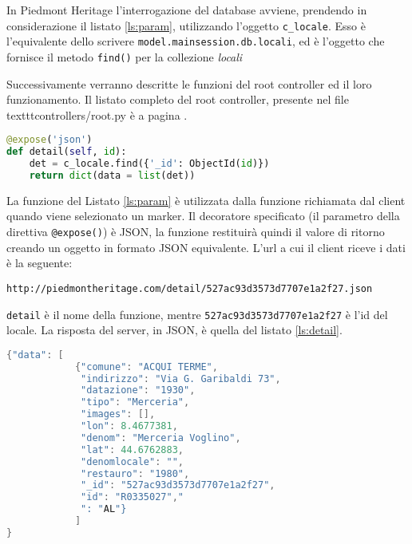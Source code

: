 In Piedmont Heritage l'interrogazione del database avviene, prendendo in considerazione il listato \ref{ls:param}, utilizzando l'oggetto \texttt{c\_locale}. Esso è l'equivalente dello scrivere \texttt{model.mainsession.db.locali}, ed è l'oggetto che fornisce il metodo \texttt{find()} per la collezione \emph{locali}


Successivamente verranno descritte le funzioni del root controller ed il loro funzionamento.
Il listato completo del root controller, presente nel file texttt{controllers/root.py} è a pagina \pageref{ls:completo}.

\begin{lstlisting}[label=ls:param,caption={Funzione utilizzata per richiedere i dettagli su un locale con ID=\texttt{id}},language=Python]
@expose('json')
def detail(self, id):
    det = c_locale.find({'_id': ObjectId(id)})
    return dict(data = list(det))
\end{lstlisting}

La funzione del Listato \ref{ls:param} è utilizzata dalla funzione richiamata dal client quando viene selezionato un marker. Il decoratore specificato (il parametro della direttiva \texttt{@expose()}) è JSON, la funzione restituirà quindi il valore di ritorno creando un oggetto in formato JSON equivalente. L'url a cui il client riceve i dati è la seguente:
\begin{lstlisting}
http://piedmontheritage.com/detail/527ac93d3573d7707e1a2f27.json
\end{lstlisting}
\texttt{detail} è il nome della funzione, mentre \texttt{527ac93d3573d7707e1a2f27} è l'id del locale. La risposta del server, in JSON, è quella del listato \ref{ls:detail}.

\begin{minipage}{\linewidth}
\begin{lstlisting}[label=ls:detail,caption={Dati in formato JSON restituiti dal server.},language=c]
{"data": [
    		{"comune": "ACQUI TERME",
    	 	 "indirizzo": "Via G. Garibaldi 73",
    	 	 "datazione": "1930",
    	 	 "tipo": "Merceria",
    	 	 "images": [],
    	 	 "lon": 8.4677381,
    	 	 "denom": "Merceria Voglino",
    	 	 "lat": 44.6762883,
    	 	 "denomlocale": "",
    	 	 "restauro": "1980",
    	 	 "_id": "527ac93d3573d7707e1a2f27",
    	 	 "id": "R0335027","
    	 	 ": "AL"}
    	    ]
}
\end{lstlisting}
\end{minipage}

